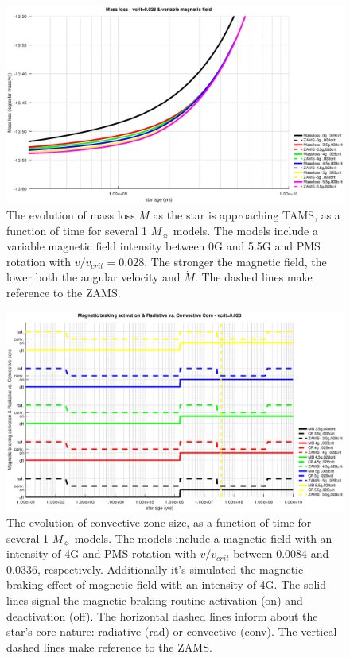 \documentclass[fleqn,usenatbib]{mnras}
\begin{document}
\begin{figure}
	\includegraphics[width=\columnwidth]{figures/mdot_vc_028_var_b_z1.eps}
    \caption{The evolution of mass loss $\Dot{M}$ as the star is approaching TAMS, as a function of time for several 1 $M_{\sun}$ models. The models include a variable magnetic field intensity between 0G and 5.5G and PMS rotation with $v/v_{crit}=0.028$. The stronger the magnetic field, the lower both the angular velocity and $\Dot{M}$. The dashed lines make reference to the ZAMS.}
    \label{fig:mdot_vc_028_var_b_z1}
\end{figure}

\begin{figure}
	\includegraphics[width=\columnwidth]{figures/mb_act_var_vel_vc_028.eps}
    \caption{The evolution of convective zone size, as a function of time for several 1 $M_{\sun}$ models. The models include a magnetic field with an intensity of 4G and PMS rotation with $v/v_{crit}$ between 0.0084 and 0.0336, respectively. Additionally it's simulated the magnetic braking effect of magnetic field with an intensity of 4G. The solid lines signal the magnetic braking routine activation (on) and deactivation (off). The horizontal dashed lines inform about the star's core nature: radiative (rad) or convective (conv). The vertical dashed lines make reference to the ZAMS.}
    \label{fig:mb_act_var_vel_vc_028}
\end{figure}
\end{document}
